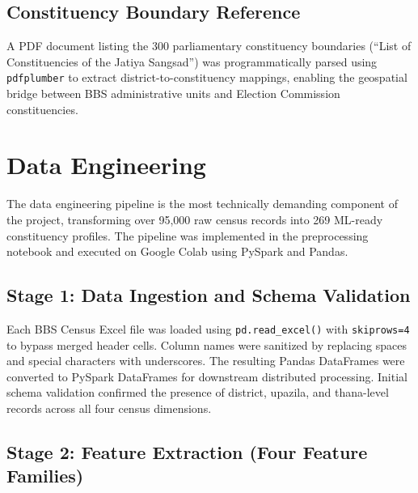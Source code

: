 \documentclass[12pt, a4paper]{article}
\begin{document}
\subsection{Constituency Boundary Reference}
A PDF document listing the 300 parliamentary constituency boundaries (``List of Constituencies of the Jatiya Sangsad'') was programmatically parsed using \texttt{pdfplumber} to extract district-to-constituency mappings, enabling the geospatial bridge between BBS administrative units and Election Commission constituencies.

\section{Data Engineering}

The data engineering pipeline is the most technically demanding component of the project, transforming over 95,000 raw census records into 269 ML-ready constituency profiles. The pipeline was implemented in the preprocessing notebook and executed on Google Colab using PySpark and Pandas.

\subsection{Stage 1: Data Ingestion and Schema Validation}
Each BBS Census Excel file was loaded using \texttt{pd.read\_excel()} with \texttt{skiprows=4} to bypass merged header cells. Column names were sanitized by replacing spaces and special characters with underscores. The resulting Pandas DataFrames were converted to PySpark DataFrames for downstream distributed processing. Initial schema validation confirmed the presence of district, upazila, and thana-level records across all four census dimensions.

\subsection{Stage 2: Feature Extraction (Four Feature Families)}
\end{document}
